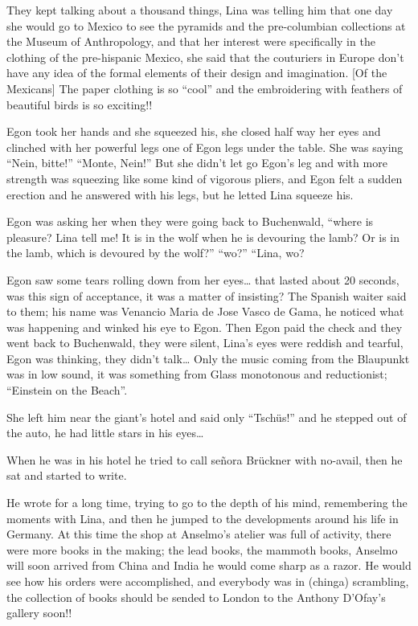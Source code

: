 \documentclass[smalldemyvopaper,11pt,twoside,onecolumn,openright,extrafontsizes]{memoir}
\begin{document}
They kept talking about a thousand things, Lina was telling him that one day she would go to Mexico to see the pyramids and the pre-columbian collections at the Museum of Anthropology, and that her interest were specifically in the clothing of the pre-hispanic Mexico, she said that the couturiers in Europe don’t have any idea of the formal elements of their design and imagination. [Of the Mexicans] The paper clothing is so “cool” and the embroidering with feathers of beautiful birds is so exciting!!

Egon took her hands and she squeezed his, she closed half way her eyes and clinched with her powerful legs one of Egon legs under the table. She was saying “Nein, bitte!” “Monte, Nein!” But she didn’t let go Egon’s leg and with more strength was squeezing like some kind of vigorous pliers, and Egon felt a sudden erection and he answered with his legs, but he letted Lina squeeze his.

Egon was asking her when they were going back to Buchenwald, “where is pleasure? Lina tell me! It is in the wolf when he is devouring the lamb? Or is in the lamb, which is devoured by the wolf?” “wo?” “Lina, wo?

Egon saw some tears rolling down from her eyes… that lasted about 20 seconds, was this sign of acceptance, it was a matter of insisting? The Spanish waiter said to them; his name was Venancio Maria de Jose Vasco de Gama, he noticed what was happening and winked his eye to Egon. Then Egon paid the check and they went back to Buchenwald, they were silent, Lina’s eyes were reddish and tearful, Egon was thinking, they didn’t talk… Only the music coming from the Blaupunkt was in low sound, it was something from Glass monotonous and reductionist; “Einstein on the Beach”.

She left him near the giant’s hotel and said only “Tschüs!” and he stepped out of the auto, he had little stars in his eyes…

When he was in his hotel he tried to call señora Brückner with no-avail, then he sat and started to write.

He wrote for a long time, trying to go to the depth of his mind, remembering the moments with Lina, and then he jumped to the developments around his life in Germany. At this time the shop at Anselmo’s atelier was full of activity, there were more books in the making; the lead books, the mammoth books, Anselmo will soon arrived from China and India he would come sharp as a razor. He would see how his orders were accomplished, and everybody was in (chinga) scrambling, the collection of books should be sended to London to the Anthony D’Ofay’s gallery soon!!
\end{document}
